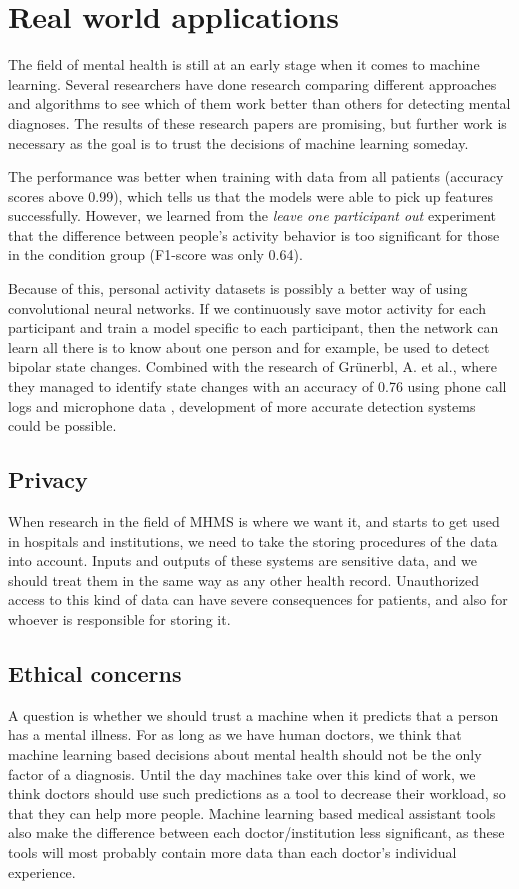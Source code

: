 \section{Real world applications}

The field of mental health is still at an early stage when it comes to machine learning. Several researchers have done research comparing different approaches and algorithms to see which of them work better than others for detecting mental diagnoses. The results of these research papers are promising, but further work is necessary as the goal is to trust the decisions of machine learning someday. 

The performance was better when training with data from all patients (accuracy scores above 0.99), which tells us that the models were able to pick up features successfully. However, we learned from the \textit{leave one participant out} experiment that the difference between people's activity behavior is too significant for those in the condition group (F1-score was only 0.64). 

Because of this, personal activity datasets is possibly a better way of using convolutional neural networks. If we continuously save motor activity for each participant and train a model specific to each participant, then the network can learn all there is to know about one person and for example, be used to detect bipolar state changes. Combined with the research of Grünerbl, A. et al., where they managed to identify state changes with an accuracy of 0.76 using phone call logs and microphone data \cite{grunerbl_smartphone_bipolar}, development of more accurate detection systems could be possible.

\subsection{Privacy}
When research in the field of MHMS is where we want it, and starts to get used in hospitals and institutions, we need to take the storing procedures of the data into account. Inputs and outputs of these systems are sensitive data, and we should treat them in the same way as any other health record. Unauthorized access to this kind of data can have severe consequences for patients, and also for whoever is responsible for storing it. 

\subsection{Ethical concerns}
A question is whether we should trust a machine when it predicts that a person has a mental illness. For as long as we have human doctors, we think that machine learning based decisions about mental health should not be the only factor of a diagnosis. Until the day machines take over this kind of work, we think doctors should use such predictions as a tool to decrease their workload, so that they can help more people. Machine learning based medical assistant tools also make the difference between each doctor/institution less significant, as these tools will most probably contain more data than each doctor's individual experience.  